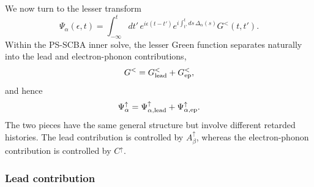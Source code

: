 \documentclass[
 reprint,
 superscriptaddress,
 amsmath,amssymb,
 aps,prb,
 longbibliography,
 floatfix
]{revtex4-2}
\newcommand{\ep}{\mathrm{ep}}
\begin{document}
We now turn to the lesser transform
\begin{equation}
\Psi_\alpha(\epsilon,t)
=
\int_{-\infty}^{t}dt'\,
e^{i\epsilon(t-t')}
e^{i\int_{t'}^t ds\,\Delta_\alpha(s)}
G^<(t,t').
\label{eq:Psi-up-definition}
\end{equation}
Within the PS-SCBA inner solve, the lesser Green function separates naturally into the lead and electron-phonon contributions,
\begin{equation*}
G^<
=
G_{\rm lead}^<
+
G_{\ep}^<,
\end{equation*}
and hence
\begin{equation}
\Psi_\alpha^\uparrow
=
\Psi_{\alpha,\rm lead}^\uparrow
+
\Psi_{\alpha,\ep}^\uparrow .
\label{eq:Psi-up-split}
\end{equation}
The two pieces have the same general structure but involve different retarded histories. The lead contribution is controlled by $A_\beta^\uparrow$, whereas the electron-phonon contribution is controlled by $C^\uparrow$.

\subsubsection{Lead contribution}
\end{document}
